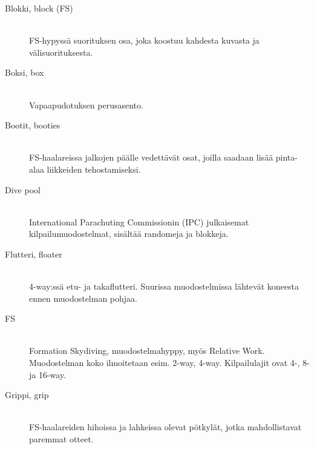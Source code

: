 \begin{description}
\item[Blokki, block (FS) ] \hfill \\ 
FS-hypyssä suorituksen osa, joka koostuu kahdesta kuvasta ja välisuorituksesta. \hfill \\ 
\end{description}
\begin{description}
\item[Boksi, box ] \hfill \\ 
Vapaapudotuksen perusasento. \hfill \\ 
\end{description}
\begin{description}
\item[Bootit, booties ] \hfill \\ 
FS-haalareissa jalkojen päälle vedettävät osat, joilla saadaan lisää pinta-alaa liikkeiden tehostamiseksi. \hfill \\ 
\end{description}
\begin{description}
\item[Dive pool ] \hfill \\ 
International Parachuting Commissionin (IPC) julkaisemat kilpailumuodostelmat, sisältää randomeja ja blokkeja. \hfill \\ 
\end{description}
\begin{description}
\item[Flutteri, floater ] \hfill \\ 
4-way:ssä etu- ja takaflutteri. Suurissa muodostelmissa lähtevät koneesta ennen muodostelman pohjaa. \hfill \\ 
\end{description}
\begin{description}
\item[FS] \hfill \\ 
Formation Skydiving, muodostelmahyppy, myös Relative Work. Muodostelman koko ilmoitetaan esim. 2-way, 4-way. Kilpailulajit ovat 4\mbox{-,} 8- ja 16-way. \hfill \\ 
\end{description}
\begin{description}
\item[Grippi, grip ] \hfill \\ 
FS-haalareiden hihoissa ja lahkeissa olevat pötkylät, jotka mahdollistavat paremmat otteet. \hfill \\ 
\end{description}

